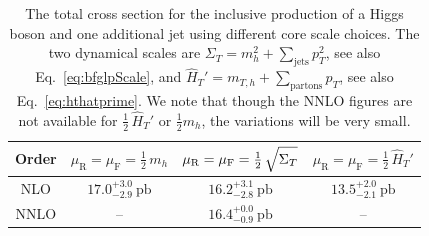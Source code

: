 \begin{table}[t!]
  \centering
  \begin{tabular}{c||c|c|c}
    Order \vphantom{$\int\limits_a^b$} &
    $\mu_\mathrm{R}=\mu_\mathrm{F}=\tfrac{1}{2}\,m_h$ &
    $\mu_\mathrm{R}=\mu_\mathrm{F}=\tfrac{1}{2}\,\sqrt{\vphantom{\big[}\Sigma_T}$ &
    $\mu_\mathrm{R}=\mu_\mathrm{F}=\tfrac{1}{2}\,\hat{H}_T'$ \\
    \hline\hline
    NLO \vphantom{$\int\limits_a^b$} &
    $17.0^{+3.0}_{-2.9}~\mathrm{pb}$ &
    $16.2^{+3.1}_{-2.8}~\mathrm{pb}$ &
    $13.5^{+2.0}_{-2.1}~\mathrm{pb}$ \\\hline
    NNLO \vphantom{$\int\limits_a^b$} & -- & $16.4^{+0.0}_{-0.9}~\mathrm{pb}$ & -- \\
    \hline
  \end{tabular}
  \caption{\label{tab:H1jXS}%
    The total cross section for the inclusive production of a Higgs
    boson and one additional jet using different core scale choices.
    The two dynamical scales are $\Sigma_T=m_h^2+\sum_\mathrm{jets}p_T^2$, see also
    Eq.~\eqref{eq:bfglpScale}, and
    $\hat{H}_T'=m_{T,h}+\sum_\mathrm{partons}p_T$,
    see also Eq.~\eqref{eq:hthatprime}. We note that though the NNLO figures
    are not available for $\tfrac{1}{2}\,\hat{H}_T'$ or $\tfrac{1}{2}m_h$, the variations
    will be very small.}
\end{table}

